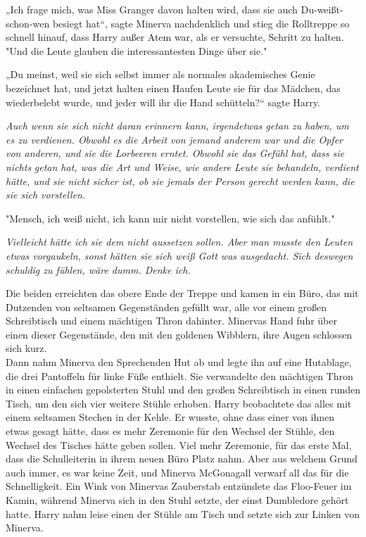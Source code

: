 {„Ich frage mich, was Miss Granger davon halten wird, dass sie auch Du-weißt-schon-wen besiegt hat“, sagte Minerva nachdenklich und stieg die Rolltreppe so schnell hinauf, dass Harry außer Atem war, als er versuchte, Schritt zu halten.\\ "Und die Leute glauben die interessantesten Dinge über sie."

„Du meinst, weil sie sich selbst immer als normales akademisches Genie bezeichnet hat, und jetzt halten einen Haufen Leute sie für das Mädchen, das wiederbelebt wurde, und jeder will ihr die Hand schütteln?“ sagte Harry.

\emph{Auch wenn sie sich nicht daran erinnern kann, irgendetwas getan zu haben, um es zu verdienen. Obwohl es die Arbeit von jemand anderem war und die Opfer von anderen, und sie die Lorbeeren erntet. Obwohl sie das Gefühl hat, dass sie nichts} \emph{getan hat, was die Art und Weise, wie andere Leute sie behandeln, verdient hätte, und sie nicht sicher ist, ob sie jemals der Person gerecht werden kann, die sie sich vorstellen.}

"Mensch, ich weiß nicht, ich kann mir nicht vorstellen, wie sich das anfühlt."

\emph{Vielleicht hätte ich sie dem nicht aussetzen sollen. Aber man musste den Leuten etwas vorgaukeln, sonst hätten sie sich weiß Gott was ausgedacht. Sich deswegen schuldig zu fühlen, wäre dumm. Denke ich.}

Die beiden erreichten das obere Ende der Treppe und kamen in ein Büro, das mit Dutzenden von seltsamen Gegenständen gefüllt war, alle vor einem großen Schreibtisch und einem mächtigen Thron dahinter. Minervas Hand fuhr über einen dieser Gegenstände, den mit den goldenen Wibblern, ihre Augen schlossen sich kurz.\\ Dann nahm Minerva den Sprechenden Hut ab und legte ihn auf eine Hutablage, die drei Pantoffeln für linke Füße enthielt. Sie verwandelte den mächtigen Thron in einen einfachen gepolsterten Stuhl und den großen Schreibtisch in einen runden Tisch, um den sich vier weitere Stühle erhoben. Harry beobachtete das alles mit einem seltsamen Stechen in der Kehle. Er wusste, ohne dass einer von ihnen etwas gesagt hätte, dass es mehr Zeremonie für den Wechsel der Stühle, den Wechsel des Tisches hätte geben sollen. Viel mehr Zeremonie, für das erste Mal, dass die Schulleiterin in ihrem neuen Büro Platz nahm. Aber aus welchem Grund auch immer, es war keine Zeit, und Minerva McGonagall verwarf all das für die Schnelligkeit. Ein Wink von Minervas Zauberstab entzündete das Floo-Feuer im Kamin, während Minerva sich in den Stuhl setzte, der einst Dumbledore gehört hatte. Harry nahm leise einen der Stühle am Tisch und setzte sich zur Linken von Minerva.

}
